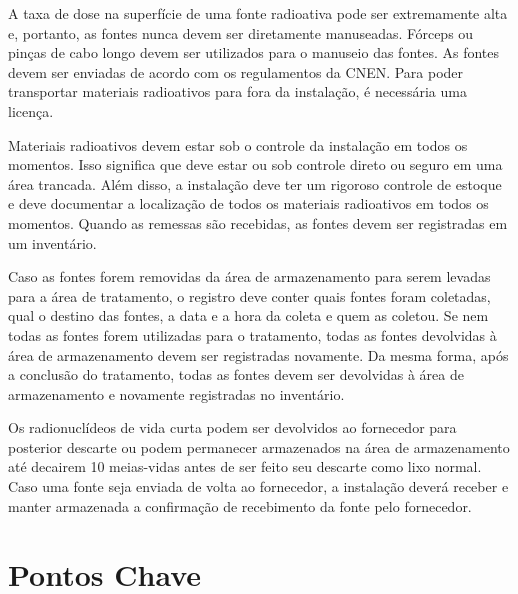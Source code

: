 \documentclass[11pt,a4paper]{article}
\begin{document}
	A taxa de dose na superfície de uma fonte radioativa pode ser extremamente alta e, portanto, as fontes nunca devem ser diretamente manuseadas. Fórceps ou pinças de cabo longo devem ser utilizados para o manuseio das fontes. As fontes devem ser enviadas de acordo com os regulamentos da CNEN. Para poder transportar materiais radioativos para fora da instalação, é necessária uma licença. 

	Materiais radioativos devem estar sob o controle da instalação em todos os momentos. Isso significa que deve estar ou sob controle direto ou seguro em uma área trancada. Além disso, a instalação deve ter um rigoroso controle de estoque e deve documentar a localização de todos os materiais radioativos em todos os momentos. Quando as remessas são recebidas, as fontes devem ser registradas em um inventário.
	
	Caso as fontes forem removidas da área de armazenamento para serem levadas para a área de tratamento, o registro deve conter quais fontes foram coletadas, qual o destino das fontes, a data e a hora da coleta e quem as coletou. Se nem todas as fontes forem utilizadas para o tratamento, todas as fontes devolvidas à área de armazenamento devem ser registradas novamente. Da mesma forma, após a conclusão do tratamento, todas as fontes devem ser devolvidas à área de armazenamento e novamente registradas no inventário.
	
	Os radionuclídeos de vida curta podem ser devolvidos ao fornecedor para posterior descarte ou podem permanecer armazenados na área de armazenamento até decairem 10 meias-vidas antes de ser feito seu descarte como lixo normal. Caso uma fonte seja enviada de volta ao fornecedor, a instalação deverá receber e manter armazenada a confirmação de recebimento da fonte pelo fornecedor.

\section{Pontos Chave}
\end{document}
